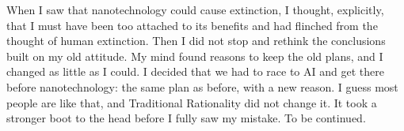 When I saw that nanotechnology could cause extinction, I thought, explicitly, that I must have been too attached to its benefits and had flinched from the thought of human extinction. Then I did not stop and rethink the conclusions built on my old attitude. My mind found reasons to keep the old plans, and I changed as little as I could. I decided that we had to race to AI and get there before nanotechnology: the same plan as before, with a new reason.  I guess most people are like that, and Traditional Rationality did not change it. It took a stronger boot to the head before I fully saw my mistake. To be continued.

